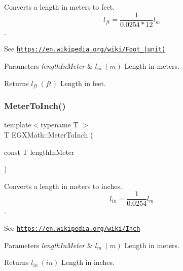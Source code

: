 Converts a length in meters to feet. \[ l_{ft}= \frac{1}{0.0254 * 12} l_{m} \]. 

See \href{https://en.wikipedia.org/wiki/Foot_(unit)}{\tt https\+://en.\+wikipedia.\+org/wiki/\+Foot\+\_\+(unit)} 
\begin{DoxyParams}{Parameters}
{\em length\+In\+Meter} & $ l_{m}\ (m)$ Length in meters. \\
\hline
\end{DoxyParams}
\begin{DoxyReturn}{Returns}
$ l_{ft}\ (ft)$ Length in feet. 
\end{DoxyReturn}
\mbox{\label{group___e_g_x_math-_conversions-_length_conversions-_meter-_imperial_gaaf056673bfe97e10a61a527f4b3598ba}} 
\subsubsection{\texorpdfstring{Meter\+To\+Inch()}{MeterToInch()}}
{\footnotesize\ttfamily template$<$typename T $>$ \\
T E\+G\+X\+Math\+::\+Meter\+To\+Inch (\begin{DoxyParamCaption}\item[{const T}]{length\+In\+Meter }\end{DoxyParamCaption})}



Converts a length in meters to inches. \[ l_{in}=\frac{1}{0.0254} l_{m} \]. 

See \href{https://en.wikipedia.org/wiki/Inch}{\tt https\+://en.\+wikipedia.\+org/wiki/\+Inch} 
\begin{DoxyParams}{Parameters}
{\em length\+In\+Meter} & $ l_{m}\ (m)$ Length in meters. \\
\hline
\end{DoxyParams}
\begin{DoxyReturn}{Returns}
$ l_{in}\ (in)$ Length in inches. 
\end{DoxyReturn}
\mbox{\label{group___e_g_x_math-_conversions-_length_conversions-_meter-_imperial_ga6a58893d0f7e17e425c7bd0b3235320d}} 
